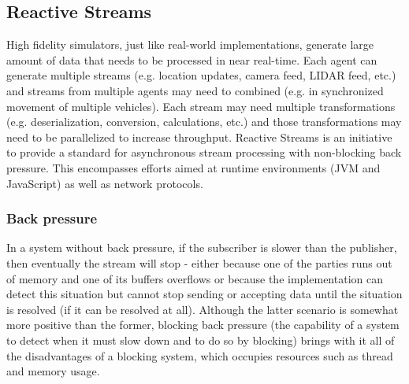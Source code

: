 \documentclass{article}
\begin{document}


\subsection{Reactive Streams}


High fidelity simulators, just like real-world implementations, generate large amount of data that needs to be processed in near real-time. Each agent can generate multiple streams (e.g. location updates, camera feed, LIDAR feed, etc.) and streams from multiple agents may need to combined (e.g. in synchronized movement of multiple vehicles). Each stream may need multiple transformations (e.g. deserialization, conversion, calculations, etc.) and those transformations may need to be parallelized to increase throughput.
Reactive Streams is an initiative to provide a standard for asynchronous stream processing with non-blocking back pressure. This encompasses efforts aimed at runtime environments (JVM and JavaScript) as well as network protocols. \cite{reactive-manifesto} 

\subsubsection{Back pressure}
In a system without back pressure, if the subscriber is slower than the publisher, then eventually the stream will stop - either because one of the parties runs out of memory and one of its buffers overflows or because the implementation can detect this situation but cannot  stop sending or accepting data until the situation is resolved (if it can be resolved at all). Although the latter scenario is somewhat more positive than the former, blocking back pressure (the capability of a system to detect when it must slow down and to do so by blocking) brings with it all of the disadvantages of a blocking system, which occupies resources such as thread and memory usage. \cite{reactive-web-apps}
\end{document}

